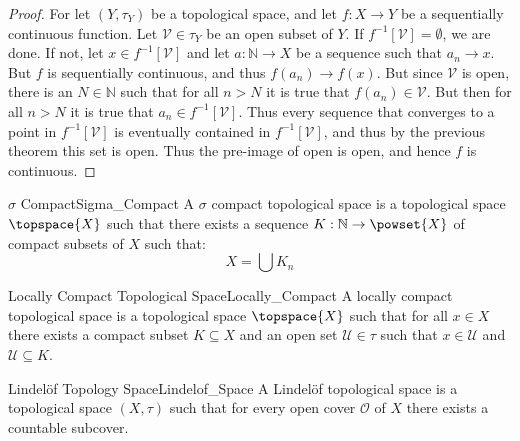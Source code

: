 \documentclass{article}                                                        %
\begin{document}
        \begin{proof}
            For let $(Y,\tau_{Y})$ be a topological space, and let
            $f:X\rightarrow{Y}$ be a sequentially continuous function. Let
            $\mathcal{V}\in\tau_{Y}$ be an open subset of $Y$. If
            $f^{\minus{1}}[\mathcal{V}]=\emptyset$, we are done. If not, let
            $x\in{f}^{\minus{1}}[\mathcal{V}]$ and let
            $a:\mathbb{N}\rightarrow{X}$ be a sequence such that
            $a_{n}\rightarrow{x}$. But $f$ is sequentially continuous, and thus
            $f(a_{n})\rightarrow{f}(x)$. But since $\mathcal{V}$ is open, there
            is an $N\in\mathbb{N}$ such that for all $n>N$ it is true that
            $f(a_{n})\in\mathcal{V}$. But then for all $n>N$ it is true that
            $a_{n}\in{f}^{\minus{1}}[\mathcal{V}]$. Thus every sequence that
            converges to a point in $f^{\minus{1}}[\mathcal{V}]$ is eventually
            contained in $f^{\minus{1}}[\mathcal{V}]$, and thus by the
            previous theorem this set is open. Thus the pre-image of open is
            open, and hence $f$ is continuous.
        \end{proof}
        \begin{fdefinition}{$\sigma$ Compact}{Sigma_Compact}
            A $\sigma$ compact topological space is a topological space
            $\topspace{X}$ such that there exists a sequence
            $K:\mathbb{N}\rightarrow\powset{X}$ of compact subsets of $X$ such
            that:
            \begin{equation*}
                X=\bigcup{K}_{n}
            \end{equation*}
        \end{fdefinition}
        \begin{fdefinition}{Locally Compact Topological Space}{Locally_Compact}
            A locally compact topological space is a topological space
            $\topspace{X}$ such that for all $x\in{X}$ there exists a compact
            subset $K\subseteq{X}$ and an open set $\mathcal{U}\in\tau$ such
            that $x\in\mathcal{U}$ and $\mathcal{U}\subseteq{K}$.
        \end{fdefinition}
        \begin{fdefinition}{Lindel\"{o}f Topology Space}{Lindelof_Space}
            A Lindel\"{o}f topological space is a topological space $(X,\tau)$
            such that for every open cover $\mathcal{O}$ of $X$ there exists a
            countable subcover.
        \end{fdefinition}
\end{document}
